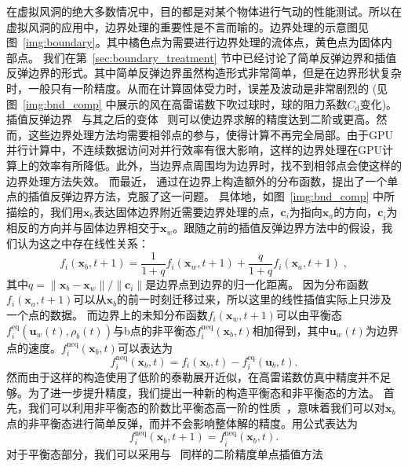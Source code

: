 在虚拟风洞的绝大多数情况中，目的都是对某个物体进行气动的性能测试。所以在虚拟风洞的应用中，边界处理的重要性是不言而喻的。边界处理的示意图见图~\ref{img:boundary}。其中橘色点为需要进行边界处理的流体点，黄色点为固体内部点。
我们在第~\ref{sec:boundary_treatment} 节中已经讨论了简单反弹边界和插值反弹边界的形式。其中简单反弹边界虽然构造形式非常简单，但是在边界形状复杂时，一般只有一阶精度。从而在计算固体受力时，误差及波动是非常剧烈的 (见图~\ref{img:bnd_comp} 中展示的风在高雷诺数下吹过球时，球的阻力系数$C_\text{d}$变化)。
插值反弹边界~\citep{Bouzidi-2001} 与其之后的变体~\citep{Yu-2003, Ginzburg-2003, Chun-2007} 则可以使边界求解的精度达到二阶或更高。然而，这些边界处理方法均需要相邻点的参与，使得计算不再完全局部。由于GPU并行计算中，不连续数据访问对并行效率有很大影响，这样的边界处理在GPU计算上的效率有所降低。此外，当边界点周围均为边界时，找不到相邻点会使这样的边界处理方法失效。
而最近，\citet{Tao-2018-b} 通过在边界上构造额外的分布函数，提出了一个单点的插值反弹边界方法，克服了这一问题。
具体地，如图~\ref{img:bnd_comp} 中所描绘的，我们用$\bm{x}_{b}$表达固体边界附近需要边界处理的点，$\bm{c}_{i}$为指向$\bm{x}_{a}$的方向，$\bm{c}_{\bar{i}}$为相反的方向并与固体边界相交于$\bm{x}_{w}$。跟随之前的插值反弹边界方法中的假设，我们认为这之中存在线性关系：
\begin{equation}
f_i(\bm{x}_b, t\!+\!1) = \frac{1}{1+q}f_{i}(\bm{x}_w, t\!+\!1)+ \frac{q}{1+q}f_{i}(\bm{x}_a, t\!+\!1) \;,
\end{equation}
其中$q=\|\bm{x}_b - \bm{x}_w\|/\|\bm{c}_i\|$是边界点到边界的归一化距离。
因为分布函数$f_{i}(\bm{x}_a, t+1)$可以从$\bm{x}_b$的前一时刻迁移过来，所以这里的线性插值实际上只涉及一个点的数据。
而边界上的未知分布函数$f_{i}(\bm{x}_w, t\!+\!1)$可以由平衡态$f_{i}^\text{eq}(\bm{u}_w(t), \rho_b(t))$与b点的非平衡态$f_{i}^\text{neq}(\bm{x}_b, t)$相加得到，其中$\bm{u}_w(t)$为边界点的速度。$f_{i}^\text{neq}(\bm{x}_b, t)$可以表达为
\begin{equation}
f_{i}^\text{neq}(\bm{x}_b, t) = f_{i}(\bm{x}_b, t) - f_{i}^\text{eq}(\bm{u}_b, t).
\end{equation}
然而由于这样的构造使用了低阶的泰勒展开近似，在高雷诺数仿真中精度并不足够。为了进一步提升精度，我们提出一种新的构造平衡态和非平衡态的方法。
首先，我们可以利用非平衡态的阶数比平衡态高一阶的性质~\citep{Chun-2007}，意味着我们可以对$\bm{x}_b$点的非平衡态进行简单反弹，而并不会影响整体解的精度。用公式表达为
\begin{equation}
\label{eq:neq_bb}
f^\text{neq}_{i}(\bm{x}_b, t\!+\!1) = f^\text{neq}_{\bar{i}}(\bm{x}_b, t).
\end{equation}
对于平衡态部分，我们可以采用与~\citep{Tao-2018-b} 同样的二阶精度单点插值方法
